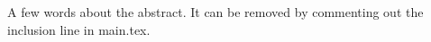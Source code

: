 
A few words about the abstract. It can be removed by commenting out the inclusion line in main.tex.